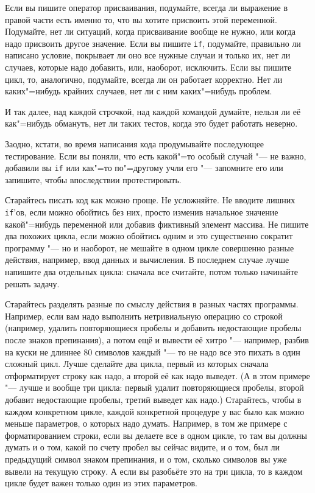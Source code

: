 Если вы пишите оператор присваивания, подумайте, всегда ли выражение в правой части есть именно то, что вы хотите присвоить этой переменной. 
Подумайте, нет ли ситуаций, когда присваивание вообще не нужно, или когда надо присвоить другое значение. 
Если вы пишите \verb'if', подумайте, правильно ли написано условие, покрывает ли оно все нужные случаи и только их, нет ли случаев, которые надо добавить,
или, наоборот, исключить.
Если вы пишите цикл, то, аналогично, подумайте, всегда ли он работает корректно. 
Нет ли каких"=нибудь крайних случаев, нет ли с ним каких"=нибудь проблем.

И так далее, над каждой строчкой, над каждой командой думайте, нельзя ли её как"=нибудь обмануть, нет ли таких тестов, когда это будет работать неверно.

Заодно, кстати, во время написания кода продумывайте последующее тестирование. 
Если вы поняли, что есть какой"=то особый случай "--- не важно, добавили вы \verb'if' или как"=то по"=другому учли его "--- 
запомните его или запишите, чтобы впоследствии протестировать.

Старайтесь писать код как можно проще. Не усложняйте. 
Не вводите лишних \verb'if''ов, если можно обойтись без них, просто изменив начальное значение какой"=нибудь переменной или добавив фиктивный элемент массива.
Не пишите два похожих цикла, если можно обойтись одним и это существенно сократит программу "--- 
но и наоборот, не мешайте в одном цикле совершенно разные действия, например, ввод данных и вычисления. 
В последнем случае лучше напишите два отдельных цикла: сначала все считайте, потом только начинайте решать задачу.

Старайтесь разделять разные по смыслу действия в разных частях программы. 
Например, если вам надо выполнить нетривиальную операцию со строкой (например, удалить повторяющиеся пробелы и добавить недостающие пробелы после знаков препинания),
а потом ещё и вывести её хитро "--- например, разбив на куски не длиннее 80 символов каждый "--- то не надо все это пихать в один сложный цикл.
Лучше сделайте два цикла, первый из которых сначала отформатирует строку как надо, а второй её как надо выведет.
(А в этом примере "--- лучше и вообще три цикла: первый удалит повторяющиеся пробелы, второй добавит недостающие пробелы, третий выведет как надо.)
Старайтесь, чтобы в каждом конкретном цикле, каждой конкретной процедуре у вас было как можно меньше параметров, о которых надо думать. 
Например, в том же примере с форматированием строки, если вы делаете все в одном цикле, то там вы должны думать и о том, какой по счету пробел вы сейчас видите,
и о том, был ли предыдущий символ знаком препинания, и о том, сколько символов вы уже вывели на текущую строку. 
А если вы разобьёте это на три цикла, то в каждом цикле будет важен только один из этих параметров.

